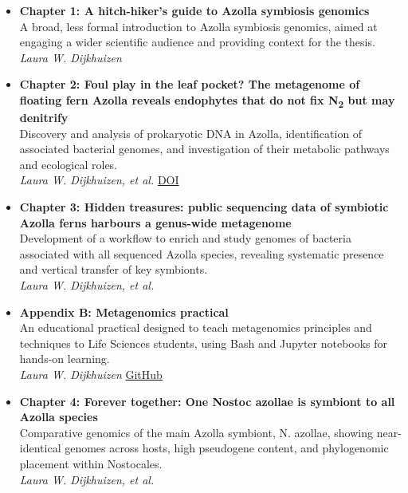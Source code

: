 \documentclass[a4paper,10pt]{article}
\begin{document}
\begin{itemize}
  \setlength{\itemsep}{0.3em}
  \item \textbf{Chapter 1: A hitch-hiker’s guide to Azolla symbiosis genomics} \\
    A broad, less formal introduction to Azolla symbiosis genomics, aimed at engaging a wider scientific audience and providing context for the thesis. \\
    \emph{Laura W. Dijkhuizen}

  \item \textbf{Chapter 2: Foul play in the leaf pocket? The metagenome of floating fern Azolla reveals endophytes that do not fix N\textsubscript{2} but may denitrify} \\
    Discovery and analysis of prokaryotic DNA in Azolla, identification of associated bacterial genomes, and investigation of their metabolic pathways and ecological roles. \\
    \emph{Laura W. Dijkhuizen, et al.}
    \href{https://doi.org/10.1111/nph.14843}{DOI}

  \item \textbf{Chapter 3: Hidden treasures: public sequencing data of symbiotic Azolla ferns harbours a genus-wide metagenome} \\
    Development of a workflow to enrich and study genomes of bacteria associated with all sequenced Azolla species, revealing systematic presence and vertical transfer of key symbionts. \\
    \emph{Laura W. Dijkhuizen, et al.}

  \item \textbf{Appendix B: Metagenomics practical} \\
    An educational practical designed to teach metagenomics principles and techniques to Life Sciences students, using Bash and Jupyter notebooks for hands-on learning. \\
    \emph{Laura W. Dijkhuizen}
    \href{https://github.com/lauralwd/metagenomicspractical}{GitHub}

  \item \textbf{Chapter 4: Forever together: One Nostoc azollae is symbiont to all Azolla species} \\
    Comparative genomics of the main Azolla symbiont, N. azollae, showing near-identical genomes across hosts, high pseudogene content, and phylogenomic placement within Nostocales. \\
    \emph{Laura W. Dijkhuizen, et al.}


\end{itemize}
\end{document}
